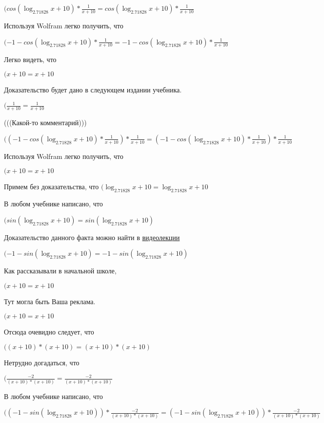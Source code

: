 \documentclass[12pt,a4paper,fleqn]{article}
\theoremstyle{definition}
\begin{document}
$(cos(\log_{ 2.71828 }{ x  +  10 }) * \frac{ 1 }{ x  +  10 }
 = cos(\log_{ 2.71828 }{ x  +  10 }) * \frac{ 1 }{ x  +  10 }
$

Используя Wolfram легко получить, что

$( -1  - cos(\log_{ 2.71828 }{ x  +  10 }) * \frac{ 1 }{ x  +  10 }
 =  -1  - cos(\log_{ 2.71828 }{ x  +  10 }) * \frac{ 1 }{ x  +  10 }
$

Легко видеть, что

$( x  +  10  =  x  +  10 $

Доказательство будет дано в следующем издании учебника.

$(\frac{ 1 }{ x  +  10 }
 = \frac{ 1 }{ x  +  10 }
$

(((Какой-то комментарий)))

$(( -1  - cos(\log_{ 2.71828 }{ x  +  10 }) * \frac{ 1 }{ x  +  10 }
) * \frac{ 1 }{ x  +  10 }
 = ( -1  - cos(\log_{ 2.71828 }{ x  +  10 }) * \frac{ 1 }{ x  +  10 }
) * \frac{ 1 }{ x  +  10 }
$

Используя Wolfram легко получить, что

$( x  +  10  =  x  +  10 $

Примем без доказательства, что
$(\log_{ 2.71828 }{ x  +  10 } = \log_{ 2.71828 }{ x  +  10 }$

В любом учебнике написано, что

$(sin(\log_{ 2.71828 }{ x  +  10 }) = sin(\log_{ 2.71828 }{ x  +  10 })$

Доказательство данного факта можно найти в \href{https://www.youtube.com/watch?v=dQw4w9WgXcQ}{видеолекции}

$( -1  - sin(\log_{ 2.71828 }{ x  +  10 }) =  -1  - sin(\log_{ 2.71828 }{ x  +  10 })$

Как рассказывали в начальной школе,

$( x  +  10  =  x  +  10 $

Тут могла быть Ваша реклама.

$( x  +  10  =  x  +  10 $

Отсюда очевидно следует, что

$(( x  +  10 ) * ( x  +  10 ) = ( x  +  10 ) * ( x  +  10 )$

Нетрудно догадаться, что

$(\frac{ -2 }{( x  +  10 ) * ( x  +  10 )}
 = \frac{ -2 }{( x  +  10 ) * ( x  +  10 )}
$

В любом учебнике написано, что

$(( -1  - sin(\log_{ 2.71828 }{ x  +  10 })) * \frac{ -2 }{( x  +  10 ) * ( x  +  10 )}
 = ( -1  - sin(\log_{ 2.71828 }{ x  +  10 })) * \frac{ -2 }{( x  +  10 ) * ( x  +  10 )}
$
\end{document}
